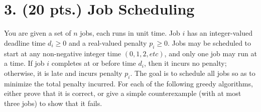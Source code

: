 \documentclass[11pt]{article}
\begin{document}

\label{pg:end-of-p2}
%

\newpage

\section*{3. (20 pts.) Job Scheduling}

You are given a set of $n$ jobs, each runs in unit time.
 Job $i$ has an integer-valued deadline time $d_i \geq  0$ and a real-valued penalty $p_i \geq 0$.
 Jobs may be scheduled to start at any non-negative integer time $(0, 1, 2, etc)$, and
 only one job may run at a time. If job $i$ completes at or before time $d_i$, then it 
incurs no penalty; otherwise, it is late and incurs penalty $p_i$. The goal is to 
schedule all jobs so as to minimize the total penalty incurred.
For each of the following greedy algorithms, either prove that it is correct, or give
 a simple counterexample (with at most three jobs) to show that it fails.
\end{document}
